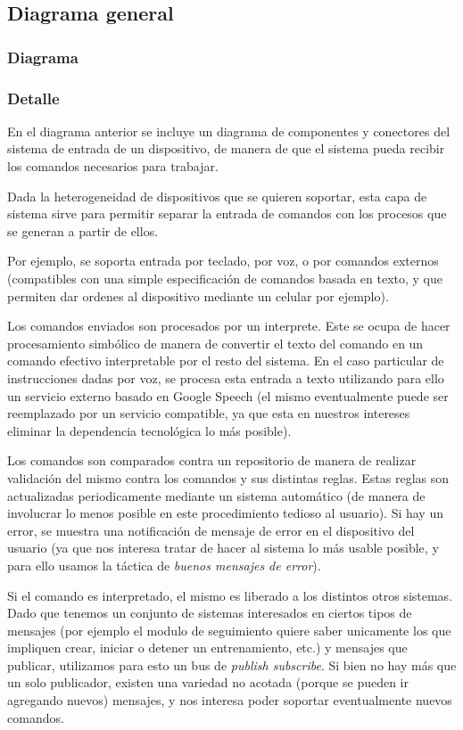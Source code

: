\subsection{Diagrama general}
\subsubsection{Diagrama}


\subsubsection{Detalle}

En el diagrama anterior se incluye un diagrama de componentes y
conectores del sistema de entrada de un dispositivo, de manera de
que el sistema pueda recibir los comandos necesarios para trabajar.

Dada la heterogeneidad de dispositivos que se quieren soportar,
esta capa de sistema sirve para permitir separar la entrada de
comandos con los procesos que se generan a partir de ellos.

Por ejemplo, se soporta entrada por teclado, por voz, o por 
comandos externos (compatibles con una simple especificación de
comandos basada en texto, y que permiten dar ordenes al dispositivo
mediante un celular por ejemplo).

Los comandos enviados son procesados por un interprete. Este se 
ocupa de hacer procesamiento simbólico de manera de convertir el texto
del comando en un comando efectivo interpretable por el resto del
sistema. En el caso particular de instrucciones dadas por voz, se 
procesa esta entrada a texto utilizando para ello un servicio externo
basado en Google Speech (el mismo eventualmente puede ser reemplazado
por un servicio compatible, ya que esta en nuestros intereses eliminar
la dependencia tecnológica lo más posible).

Los comandos son comparados contra un repositorio de manera de 
realizar validación del mismo contra los comandos y sus distintas
reglas. Estas reglas son actualizadas periodicamente mediante un
sistema automático (de manera de involucrar lo menos posible 
en este procedimiento tedioso al usuario). Si hay un error, se 
muestra una notificación de mensaje de error en el dispositivo del
usuario (ya que nos interesa tratar de hacer al sistema lo más usable
posible, y para ello usamos la táctica de \textit{buenos mensajes de
error}). 

Si el comando es interpretado, el mismo es liberado a los distintos
otros sistemas. Dado que tenemos un conjunto de sistemas interesados
en ciertos tipos de mensajes (por ejemplo el modulo de seguimiento
quiere saber unicamente los que impliquen crear, iniciar o detener
un entrenamiento, etc.) y mensajes que publicar, utilizamos para esto
un bus de \textit{publish subscribe}. Si bien no hay más que un solo
publicador, existen una variedad no acotada (porque se pueden ir
agregando nuevos) mensajes, y nos interesa poder soportar eventualmente
nuevos comandos.

